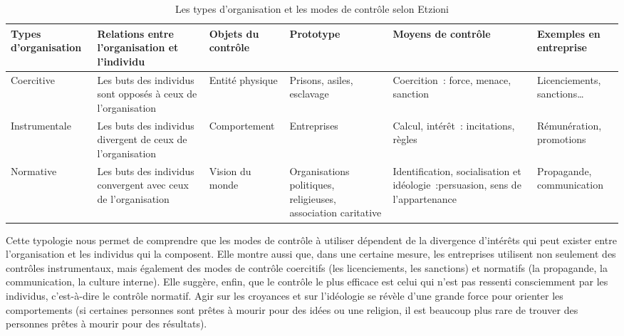 \documentclass{tufte-handout}
\begin{document}
\begin{enumerate}
\begin{table}[htbp]
\caption{Les types d'organisation et les modes de contrôle selon Etzioni}
\centering
\begin{tabular}{llllll}
Types d'organisation & Relations entre l'organisation et l'individu & Objets du contrôle & Prototype & Moyens de contrôle & Exemples en entreprise\\
\hline
Coercitive & Les buts des individus sont opposés à ceux de l'organisation & Entité physique & Prisons, asiles, esclavage & Coercition : force, menace, sanction & Licenciements, sanctions\ldots{}\\
Instrumentale & Les buts des individus divergent de ceux de l'organisation & Comportement & Entreprises & Calcul, intérêt :  incitations, règles & Rémunération, promotions\\
Normative & Les buts des individus convergent avec ceux de l'organisation & Vision du monde & Organisations politiques, religieuses, association caritative & Identification, socialisation et idéologie :persuasion, sens de l'appartenance & Propagande, communication\\
\end{tabular}
\end{table}

Cette typologie nous permet de comprendre que les modes de contrôle à utiliser dépendent de la divergence d'intérêts qui peut exister entre l'organisation et les individus qui la composent. Elle montre aussi que, dans une certaine mesure, les entreprises utilisent non seulement des contrôles instrumentaux, mais également des modes de contrôle coercitifs (les licenciements, les sanctions) et normatifs (la propagande, la communication, la culture interne). Elle suggère, enfin, que le contrôle le plus efficace est celui qui n'est pas ressenti consciemment par les individus, c'est-à-dire le contrôle normatif. Agir sur les croyances et sur l'idéologie se révèle d'une grande force pour orienter les comportements (si certaines personnes sont prêtes à mourir pour des idées ou une religion, il est beaucoup plus rare de trouver des personnes prêtes à mourir pour des résultats).\\


\end{enumerate}
\end{document}

